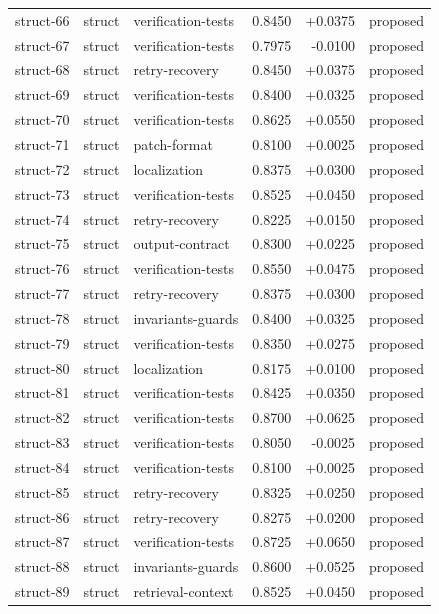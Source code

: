 \begin{center}
\begin{longtable}{llp{5.2cm}rrl}
struct-66 & struct & verification-tests & 0.8450 & +0.0375 & proposed \\
struct-67 & struct & verification-tests & 0.7975 & -0.0100 & proposed \\
struct-68 & struct & retry-recovery & 0.8450 & +0.0375 & proposed \\
struct-69 & struct & verification-tests & 0.8400 & +0.0325 & proposed \\
struct-70 & struct & verification-tests & 0.8625 & +0.0550 & proposed \\
struct-71 & struct & patch-format & 0.8100 & +0.0025 & proposed \\
struct-72 & struct & localization & 0.8375 & +0.0300 & proposed \\
struct-73 & struct & verification-tests & 0.8525 & +0.0450 & proposed \\
struct-74 & struct & retry-recovery & 0.8225 & +0.0150 & proposed \\
struct-75 & struct & output-contract & 0.8300 & +0.0225 & proposed \\
struct-76 & struct & verification-tests & 0.8550 & +0.0475 & proposed \\
struct-77 & struct & retry-recovery & 0.8375 & +0.0300 & proposed \\
struct-78 & struct & invariants-guards & 0.8400 & +0.0325 & proposed \\
struct-79 & struct & verification-tests & 0.8350 & +0.0275 & proposed \\
struct-80 & struct & localization & 0.8175 & +0.0100 & proposed \\
struct-81 & struct & verification-tests & 0.8425 & +0.0350 & proposed \\
struct-82 & struct & verification-tests & 0.8700 & +0.0625 & proposed \\
struct-83 & struct & verification-tests & 0.8050 & -0.0025 & proposed \\
struct-84 & struct & verification-tests & 0.8100 & +0.0025 & proposed \\
struct-85 & struct & retry-recovery & 0.8325 & +0.0250 & proposed \\
struct-86 & struct & retry-recovery & 0.8275 & +0.0200 & proposed \\
struct-87 & struct & verification-tests & 0.8725 & +0.0650 & proposed \\
struct-88 & struct & invariants-guards & 0.8600 & +0.0525 & proposed \\
struct-89 & struct & retrieval-context & 0.8525 & +0.0450 & proposed \\

\end{longtable}
\end{center}
